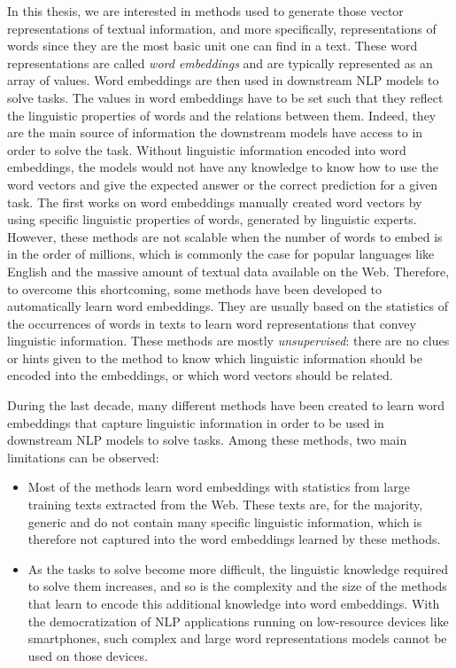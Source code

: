 In this thesis, we are interested in methods used to generate those vector
representations of textual information, and more specifically, representations
of words since they are the most basic unit one can find in a text. These word
representations are called \textit{word embeddings} and are typically
represented as an array of values. Word embeddings are then used in downstream
NLP models to solve tasks. The values in word embeddings have to be set such
that they reflect the linguistic properties of words and the relations between
them. Indeed, they are the main source of information the downstream models have
access to in order to solve the task. Without linguistic information encoded
into word embeddings, the models would not have any knowledge to know how to use
the word vectors and give the expected answer or the correct prediction for a
given task. The first works on word embeddings manually created word vectors by
using specific linguistic properties of words, generated by linguistic experts.
However, these methods are not scalable when the number of words to embed is in
the order of millions, which is commonly the case for popular languages like
English and the massive amount of textual data available on the Web. Therefore,
to overcome this shortcoming, some methods have been developed to automatically
learn word embeddings. They are usually based on the statistics of the
occurrences of words in texts to learn word representations that convey
linguistic information. These methods are mostly \textit{unsupervised}: there
are no clues or hints given to the method to know which linguistic information
should be encoded into the embeddings, or which word vectors should be related.
\bigbreak

During the last decade, many different methods have been created to learn word
embeddings that capture linguistic information in order to be used in downstream
NLP models to solve tasks. Among these methods, two main limitations can be
observed:

\begin{itemize}
  \item Most of the methods learn word embeddings with statistics from large
    training texts extracted from the Web. These texts are, for the majority,
    generic and do not contain many specific linguistic information, which is
    therefore not captured into the word embeddings learned by these methods.
  \item As the tasks to solve become more difficult, the linguistic knowledge
    required to solve them increases, and so is the complexity and the size of
    the methods that learn to encode this additional knowledge into word
    embeddings. With the democratization of NLP applications running on
    low-resource devices like smartphones, such complex and large word
    representations models cannot be used on those devices.
\end{itemize}

